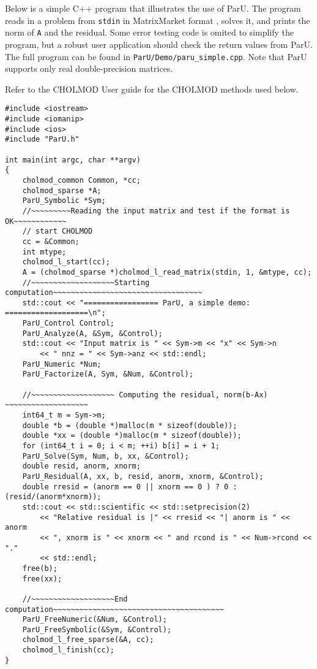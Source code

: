 \documentclass[12pt]{article}
\begin{document}
Below is a simple C++ program that illustrates the use of ParU.  The program
reads in a problem from \verb'stdin' in MatrixMarket format
\cite{BoisvertPozoRemingtonBarrettDongarra97}, solves it, and prints the norm
of \verb'A' and the residual.  Some error testing code is omited to simplify
the program, but a robust user application should check the return values from
ParU.  The full program can be found in \verb'ParU/Demo/paru_simple.cpp'.  Note
that ParU supports only real double-precision matrices.

Refer to the CHOLMOD User guide for the CHOLMOD methods used below.

\begin{verbatim}
#include <iostream>
#include <iomanip>
#include <ios>
#include "ParU.h"

int main(int argc, char **argv)
{
    cholmod_common Common, *cc;
    cholmod_sparse *A;
    ParU_Symbolic *Sym;
    //~~~~~~~~~Reading the input matrix and test if the format is OK~~~~~~~~~~~~
    // start CHOLMOD
    cc = &Common;
    int mtype;
    cholmod_l_start(cc);
    A = (cholmod_sparse *)cholmod_l_read_matrix(stdin, 1, &mtype, cc);
    //~~~~~~~~~~~~~~~~~~~Starting computation~~~~~~~~~~~~~~~~~~~~~~~~~~~~~~~~~~
    std::cout << "================= ParU, a simple demo: ===================\n";
    ParU_Control Control;
    ParU_Analyze(A, &Sym, &Control);
    std::cout << "Input matrix is " << Sym->m << "x" << Sym->n
        << " nnz = " << Sym->anz << std::endl;
    ParU_Numeric *Num;
    ParU_Factorize(A, Sym, &Num, &Control);

    //~~~~~~~~~~~~~~~~~~~ Computing the residual, norm(b-Ax) ~~~~~~~~~~~~~~~~~~~
    int64_t m = Sym->m;
    double *b = (double *)malloc(m * sizeof(double));
    double *xx = (double *)malloc(m * sizeof(double));
    for (int64_t i = 0; i < m; ++i) b[i] = i + 1;
    ParU_Solve(Sym, Num, b, xx, &Control);
    double resid, anorm, xnorm;
    ParU_Residual(A, xx, b, resid, anorm, xnorm, &Control);
    double rresid = (anorm == 0 || xnorm == 0 ) ? 0 : (resid/(anorm*xnorm));
    std::cout << std::scientific << std::setprecision(2)
        << "Relative residual is |" << rresid << "| anorm is " << anorm
        << ", xnorm is " << xnorm << " and rcond is " << Num->rcond << "."
        << std::endl;
    free(b);
    free(xx);

    //~~~~~~~~~~~~~~~~~~~End computation~~~~~~~~~~~~~~~~~~~~~~~~~~~~~~~~~~~~~~~
    ParU_FreeNumeric(&Num, &Control);
    ParU_FreeSymbolic(&Sym, &Control);
    cholmod_l_free_sparse(&A, cc);
    cholmod_l_finish(cc);
}
\end{verbatim}
\end{document}
